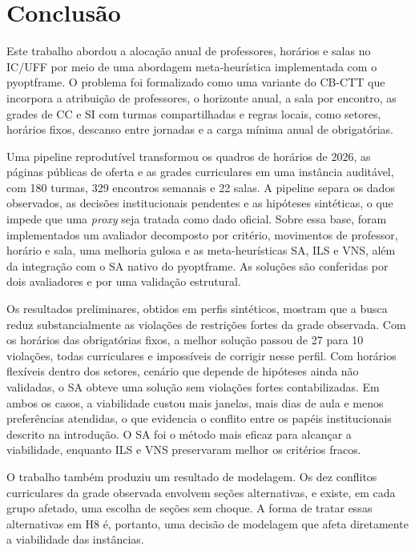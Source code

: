 \section{Conclusão}
\label{sec:conclusao}

Este trabalho abordou a alocação anual de professores, horários e salas no IC/UFF por meio de uma abordagem meta-heurística implementada com o pyoptframe. O problema foi formalizado como uma variante do CB-CTT que incorpora a atribuição de professores, o horizonte anual, a sala por encontro, as grades de CC e SI com turmas compartilhadas e regras locais, como setores, horários fixos, descanso entre jornadas e a carga mínima anual de obrigatórias.

Uma pipeline reprodutível transformou os quadros de horários de 2026, as páginas públicas de oferta e as grades curriculares em uma instância auditável, com 180 turmas, 329 encontros semanais e 22 salas. A pipeline separa os dados observados, as decisões institucionais pendentes e as hipóteses sintéticas, o que impede que uma \textit{proxy} seja tratada como dado oficial. Sobre essa base, foram implementados um avaliador decomposto por critério, movimentos de professor, horário e sala, uma melhoria gulosa e as meta-heurísticas SA, ILS e VNS, além da integração com o SA nativo do pyoptframe. As soluções são conferidas por dois avaliadores e por uma validação estrutural.

Os resultados preliminares, obtidos em perfis sintéticos, mostram que a busca reduz substancialmente as violações de restrições fortes da grade observada. Com os horários das obrigatórias fixos, a melhor solução passou de 27 para 10 violações, todas curriculares e impossíveis de corrigir nesse perfil. Com horários flexíveis dentro dos setores, cenário que depende de hipóteses ainda não validadas, o SA obteve uma solução sem violações fortes contabilizadas. Em ambos os casos, a viabilidade custou mais janelas, mais dias de aula e menos preferências atendidas, o que evidencia o conflito entre os papéis institucionais descrito na introdução. O SA foi o método mais eficaz para alcançar a viabilidade, enquanto ILS e VNS preservaram melhor os critérios fracos.

O trabalho também produziu um resultado de modelagem. Os dez conflitos curriculares da grade observada envolvem seções alternativas, e existe, em cada grupo afetado, uma escolha de seções sem choque. A forma de tratar essas alternativas em H8 é, portanto, uma decisão de modelagem que afeta diretamente a viabilidade das instâncias. 

